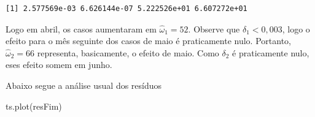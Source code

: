\documentclass[
  letterpaper,
  DIV=11,
  numbers=noendperiod]{scrartcl}
\newenvironment{Shaded}{\begin{snugshade}}{\end{snugshade}}
\newcommand{\AttributeTok}[1]{\textcolor[rgb]{0.40,0.45,0.13}{#1}}
\newcommand{\CommentTok}[1]{\textcolor[rgb]{0.37,0.37,0.37}{#1}}
\newcommand{\ControlFlowTok}[1]{\textcolor[rgb]{0.00,0.23,0.31}{\textbf{#1}}}
\newcommand{\DecValTok}[1]{\textcolor[rgb]{0.68,0.00,0.00}{#1}}
\newcommand{\FunctionTok}[1]{\textcolor[rgb]{0.28,0.35,0.67}{#1}}
\newcommand{\NormalTok}[1]{\textcolor[rgb]{0.00,0.23,0.31}{#1}}
\newcommand{\OtherTok}[1]{\textcolor[rgb]{0.00,0.23,0.31}{#1}}
\newcommand{\SpecialCharTok}[1]{\textcolor[rgb]{0.37,0.37,0.37}{#1}}
\theoremstyle{definition}
\theoremstyle{definition}
\theoremstyle{plain}
\theoremstyle{plain}
\theoremstyle{remark}
\begin{document}
\begin{verbatim}
[1] 2.577569e-03 6.626144e-07 5.222526e+01 6.607272e+01
\end{verbatim}

Logo em abril, os casos aumentaram em \(\hat{\omega}_1=52\). Observe que
\(\delta_1<0,003\), logo o efeito para o mês seguinte dos casos de maio
é praticamente nulo. Portanto, \(\hat{\omega}_2=66\) representa,
basicamente, o efeito de maio. Como \(\delta_2\) é praticamente nulo,
eses efeito somem em junho.

\begin{Shaded}
\end{Shaded}

Abaixo segue a análise usual dos resíduos

\begin{Shaded}
\begin{Highlighting}[]
\FunctionTok{ts.plot}\NormalTok{(resFim)}
\end{Highlighting}
\end{Shaded}
\end{document}

